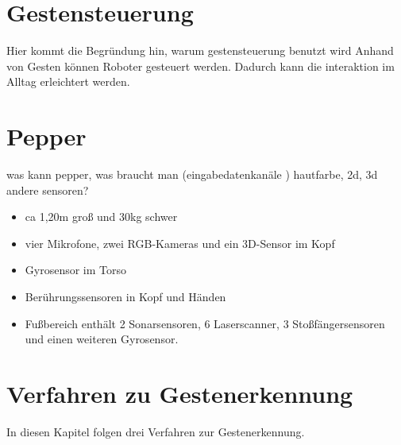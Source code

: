 \documentclass{llncs}
\begin{document}
\section{Gestensteuerung}
Hier kommt die Begründung hin, warum gestensteuerung benutzt wird
Anhand von Gesten k\"onnen Roboter gesteuert werden. Dadurch kann die interaktion im Alltag erleichtert werden. 
\section{Pepper}
 was kann pepper, was braucht man (eingabedatenkan\"ale ) hautfarbe, 2d, 3d andere sensoren?
\begin{itemize}
\item ca 1,20m gro\ss{} und 30kg schwer
\item vier Mikrofone, zwei RGB-Kameras und ein 3D-Sensor im Kopf
\item Gyrosensor im Torso
\item Ber\"uhrungssensoren in Kopf und H\"anden
\item Fu\ss{}bereich enth\"alt 2 Sonarsensoren, 6 Laserscanner, 3 Sto\ss{}f\"angersensoren und einen weiteren Gyrosensor.
\end{itemize}
\section{Verfahren zu Gestenerkennung}
In diesen Kapitel folgen drei Verfahren zur Gestenerkennung.
\end{document}
